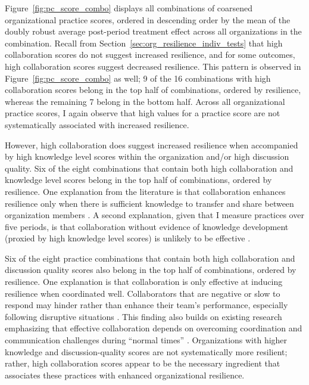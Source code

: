 \documentclass[12pt,notitlepage]{article}
\begin{document}

Figure~\ref{fig:pc_score_combo} displays all combinations of coarsened organizational practice scores, ordered in descending order by the mean of the doubly robust average post-period treatment effect across all organizations in the combination. 
Recall from Section~\ref{sec:org_resilience_indiv_tests} that high collaboration scores do not suggest increased resilience, and for some outcomes, high collaboration scores suggest decreased resilience. 
This pattern is observed in Figure~\ref{fig:pc_score_combo} as well; 9 of the 16 combinations with high collaboration scores belong in the top half of combinations, ordered by resilience, whereas the remaining 7 belong in the bottom half. 
Across all organizational practice scores, I again observe that high values for a practice score are not systematically associated with increased resilience. 

However, high collaboration does suggest increased resilience when accompanied by high knowledge level scores within the organization and/or high discussion quality. 
Six of the eight combinations that contain both high collaboration and knowledge level scores belong in the top half of combinations, ordered by resilience. 
One explanation from the literature is that collaboration enhances resilience only when there is sufficient knowledge to transfer and share between organization members \citep{GRESSGARD2015167}.
A second explanation, given that I measure practices over five periods, is that collaboration without evidence of knowledge development (proxied by high knowledge level scores) is unlikely to be effective \citep{fiol_learning_1985}. 

Six of the eight practice combinations that contain both high collaboration and discussion quality scores also  belong in the top half of combinations, ordered by resilience. 
One explanation is that collaboration is only effective  at inducing resilience when coordinated well.
Collaborators that are negative or slow to respond may hinder rather than enhance their team's performance, especially following disruptive situations \citep{gittell_2002_management}. 
This finding also builds on existing research emphasizing that effective collaboration depends on overcoming coordination and communication challenges during ``normal times'' \citep{cross_2020, DIETRICHSON2022257}. 
Organizations with higher knowledge and discussion-quality scores are not systematically more resilient; rather, high collaboration scores appear to be the necessary ingredient that associates these practices with enhanced organizational resilience.
\end{document}
